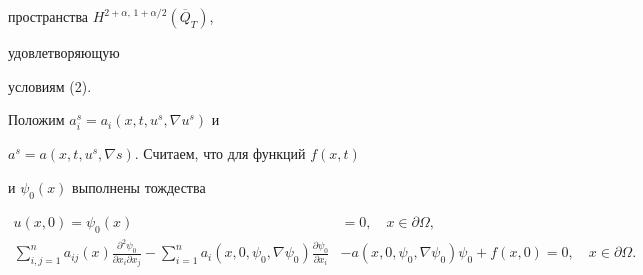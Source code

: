 пространства $H^{2+\alpha,\,1+\alpha/2}(\overline Q_T)$,


удовлетворяющую


условиям (2).





Положим $a^s_i=a_i(x,t,u^s,\nabla u^s)$ и


$a^s=a(x,t,u^s,\nabla s)$. Считаем, что для функций $f(x,t)$


и $\psi_0(x)$ выполнены тождества


\begin{equation}


\begin{split}


u(x,0)=\psi_0(x)&=0,\quad x\in\partial\Omega,\\


\sum^n_{i,j=1}a_{ij}(x)


\frac{\partial^2\psi_0}{\partial x_i\partial x_j}


-\sum^n_{i=1}a_i(x,0,\psi_0,\nabla \psi_0)


\frac{\partial \psi_0}{\partial x_i} &-


a(x,0,\psi_0,\nabla \psi_0)\psi_0+f(x,0)=0,\quad


x\in\partial\Omega.


\end{split}


\end{equation}





